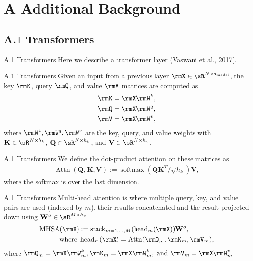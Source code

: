 \documentclass[aspectratio=169,10pt]{beamer}
\begin{document}
\appendix
\section{A Additional Background}
\subsection{A.1 Transformers}

\begin{frame}{A.1 Transformers}
Here we describe a transformer layer (Vaswani et al., 2017).
\end{frame}

\begin{frame}{A.1 Transformers}
Given an input from a previous layer $\rmX \in \sR^{N \times d_{\text{model}}}$, the key $\rmK$, query $\rmQ$, and value $\rmV$ matrices are computed as
\begin{align*}
    \rmK &= \rmX\rmW^k, \\
    \rmQ &= \rmX\rmW^q, \\
    \rmV &= \rmX\rmW^v,
\end{align*}
where $\rmW^k, \rmW^q, \rmW^v$ are the key, query, and value weights with $\mathbf{K} \in \sR^{N \times h_k}$, $\mathbf{Q} \in \sR^{N \times h_k}$, and $\mathbf{V} \in \sR^{N \times h_v}$.
\end{frame}

\begin{frame}{A.1 Transformers}
We define the dot-product attention on these matrices as
\begin{align*}
\operatorname{Attn}(\mathbf{Q,K,V}) := \operatorname{softmax} (\mathbf{QK}^T / \sqrt{h_k})\mathbf{V},
\end{align*}
where the softmax is over the last dimension.
\end{frame}

\begin{frame}{A.1 Transformers}
Multi-head attention is where multiple query, key, and value pairs are used (indexed by $m$), their results concatenated and the result projected down using $\mathbf{W}^o \in \sR^{M \times h_v}$
\begin{align*}
    \operatorname{MHSA}(\rmX) &:= \operatorname{stack}_{m=1,\ldots,M}(\operatorname{head}_m(\rmX)) \mathbf{W}^o, \\
    \text{where } &\operatorname{head}_m(\rmX)  = \operatorname{Attn} (\rmQ_m,\rmK_m, \rmV_m),
\end{align*}
where $\rmQ_m = \rmX \rmW^k_m,\rmK_m = \rmX \rmW^k_m, \text{ and } \rmV_m = \rmX \rmW^v_m$
\end{frame}
\end{document}
